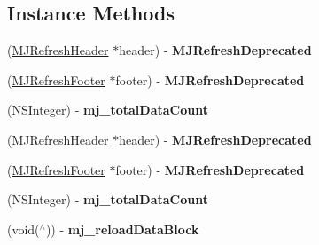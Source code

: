 \subsection*{Instance Methods}
\begin{DoxyCompactItemize}
\item 
\mbox{\label{category_u_i_scroll_view_07_m_j_refresh_08_a405b59158f276844f3e4456f4666b4ed}} 
(\mbox{\hyperlink{interface_m_j_refresh_header}{M\+J\+Refresh\+Header}} $\ast$header) -\/ {\bfseries M\+J\+Refresh\+Deprecated}
\item 
\mbox{\label{category_u_i_scroll_view_07_m_j_refresh_08_a206684c888f4eeda992ce51a72c47791}} 
(\mbox{\hyperlink{interface_m_j_refresh_footer}{M\+J\+Refresh\+Footer}} $\ast$footer) -\/ {\bfseries M\+J\+Refresh\+Deprecated}
\item 
\mbox{\label{category_u_i_scroll_view_07_m_j_refresh_08_a3c8d9bd01ad7529fad9a8604baf0b0c8}} 
(N\+S\+Integer) -\/ {\bfseries mj\+\_\+total\+Data\+Count}
\item 
\mbox{\label{category_u_i_scroll_view_07_m_j_refresh_08_a405b59158f276844f3e4456f4666b4ed}} 
(\mbox{\hyperlink{interface_m_j_refresh_header}{M\+J\+Refresh\+Header}} $\ast$header) -\/ {\bfseries M\+J\+Refresh\+Deprecated}
\item 
\mbox{\label{category_u_i_scroll_view_07_m_j_refresh_08_a206684c888f4eeda992ce51a72c47791}} 
(\mbox{\hyperlink{interface_m_j_refresh_footer}{M\+J\+Refresh\+Footer}} $\ast$footer) -\/ {\bfseries M\+J\+Refresh\+Deprecated}
\item 
\mbox{\label{category_u_i_scroll_view_07_m_j_refresh_08_a3c8d9bd01ad7529fad9a8604baf0b0c8}} 
(N\+S\+Integer) -\/ {\bfseries mj\+\_\+total\+Data\+Count}
\item 
\mbox{\label{category_u_i_scroll_view_07_m_j_refresh_08_aaeebaf16ece9a8803d541e67ba204975}} 
(void($^\wedge$)) -\/ {\bfseries mj\+\_\+reload\+Data\+Block}
\item 

\end{DoxyCompactItemize}
